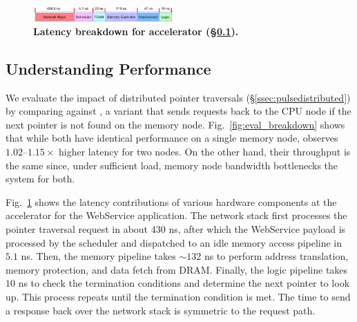 \begin{figure}[t]
  \centering	
  \includegraphics[width=0.48\textwidth]{fig/pulse/breakdown_latency_new.pdf}
  \caption[Latency breakdown for \pulse accelerator ]{\textbf{Latency breakdown for \pulse accelerator (\S\ref{ssec:pulsebreakdown}).}}
  \label{fig:eval_breakdown_latency_}
\end{figure}




\subsection{Understanding \pulse Performance}
\label{ssec:pulsebreakdown}




 We evaluate the impact of distributed pointer traversals (\S\ref{ssec:pulsedistributed}) by comparing \pulse against \pulseacc, a \pulse variant that sends requests back to the CPU node if the next pointer is not found on the memory node. Fig.~\ref{fig:eval_breakdown} shows that while both have identical performance on a single memory node, \pulseacc observes $1.02$--$1.15\times$ higher latency for two nodes. On the other hand, their throughput is the same since, under sufficient load, memory node bandwidth bottlenecks the system for both.


Fig.~\ref{fig:eval_breakdown_latency_} shows the latency contributions of various hardware components at the \pulse accelerator for the WebService application. The network stack first processes the pointer traversal request in about $430$ ns, after which the WebService payload is processed by the scheduler and dispatched to an idle memory access pipeline in $5.1$ ns. Then, the memory pipeline takes $\sim$$132$ ns to perform address translation, memory protection, and data fetch from DRAM. Finally, the logic pipeline takes $10$ ns to check the termination conditions and determine the next pointer to look up. This process repeats until the termination condition is met. The time to send a response back over the network stack is symmetric to the request path.












